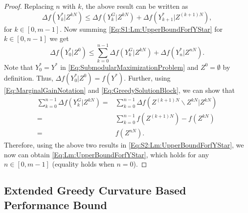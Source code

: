 \documentclass[conference]{IEEEtran}
\begin{document}
\begin{proof}
Replacing $n$ with $k$, the above result can be written as 
\begin{equation}\label{Eq:S1:Lm:UpperBoundForfYStar}
    \Delta f(Y^*_k\vert Z^{kN}) \leq \Delta f(Y^G_k\vert Z^{kN}) + \Delta f(Y^*_{k+1}\vert Z^{(k+1)N}),
\end{equation}
for $k\in[0,m-1]$. Now summing \eqref{Eq:S1:Lm:UpperBoundForfYStar} for $k\in[0,n-1]$ we get
\begin{equation}\label{Eq:S2:Lm:UpperBoundForfYStar}
    \Delta f(Y^*_0\vert Z^0) \leq \sum_{k=0}^{n-1} \Delta f(Y^G_k\vert Z^{kN}) + \Delta f(Y^*_{n}\vert Z^{nN}).
\end{equation}
Note that $Y^*_0 = Y^*$ in \eqref{Eq:SubmodularMaximizationProblem} and $Z^0=\emptyset$ by definition. Thus, $\Delta f(Y^*_0\vert Z^0) = f(Y^*)$. Further, using \eqref{Eq:MarginalGainNotation} and \eqref{Eq:GreedySolutionBlock}, we can show that 
\begin{align}
    \sum_{k=0}^{n-1} \Delta f(Y^G_k\vert Z^{kN}) 
    =& \sum_{k=0}^{n-1} \Delta f( Z^{(k+1)N} \backslash Z^{kN} \vert Z^{kN})\nonumber \\
    =& \sum_{k=0}^{n-1} f(Z^{(k+1)N}) - f(Z^{kN}) \nonumber \\
    =& f(Z^{nN}).\nonumber 
\end{align}
Therefore, using the above two results in  \eqref{Eq:S2:Lm:UpperBoundForfYStar}, we now can obtain \eqref{Eq:Lm:UpperBoundForfYStar}, which holds for any $n\in[0,m-1]$ (equality holds when $n=0$). 
\end{proof}


\subsection{Extended Greedy Curvature Based Performance Bound}
\end{document}
